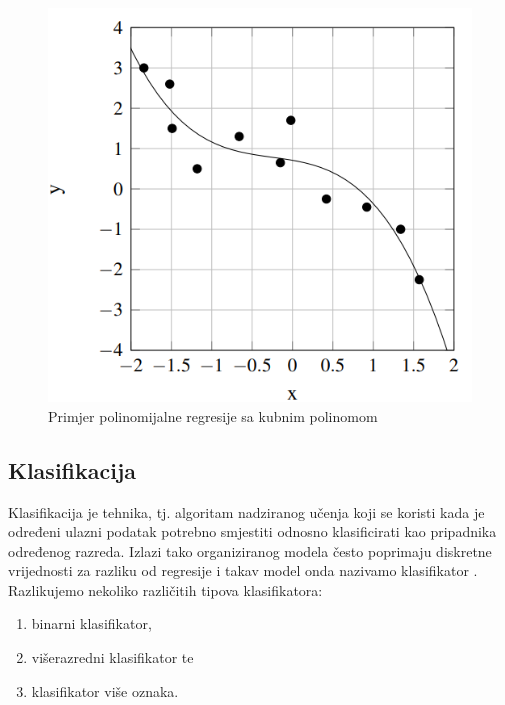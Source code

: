 \documentclass[times, utf8, zavrsni]{fer}
\begin{document}
\begin{figure}[H]
    \centering
    \includegraphics[scale=0.75]{img/polynom-regression.png}
    \caption[Caption for LOF]{Primjer polinomijalne regresije sa kubnim polinomom\footnotemark}
    \label{fig:polynom-regression}
\end{figure}

\subsection{Klasifikacija}
Klasifikacija  je tehnika, tj. algoritam nadziranog učenja koji se koristi kada je određeni ulazni podatak potrebno smjestiti odnosno klasificirati kao pripadnika određenog razreda. Izlazi tako organiziranog modela često poprimaju diskretne vrijednosti za razliku od regresije i takav model onda nazivamo klasifikator . Razlikujemo nekoliko različitih tipova klasifikatora:

\begin{enumerate}
    \item binarni klasifikator,
    \item višerazredni klasifikator te
    \item klasifikator više oznaka.
\end{enumerate}

\smallskip
\end{document}
